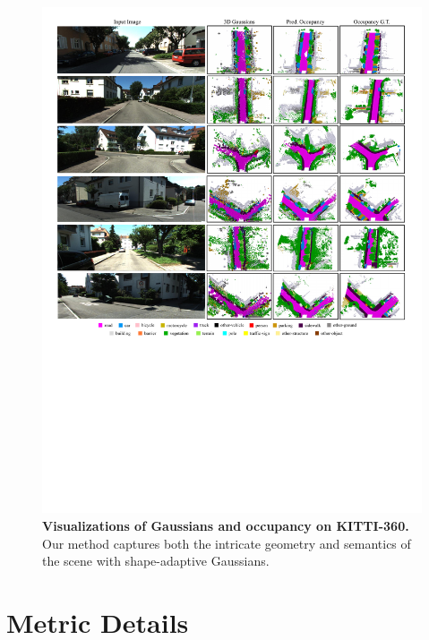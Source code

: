 \begin{figure}[t]
\centering
\includegraphics[width=0.95\linewidth]{figures/supp1.pdf}
\vspace{-2mm}
\caption{\textbf{Visualizations of Gaussians and occupancy on KITTI-360.}
Our method captures both the intricate geometry and semantics of the scene with shape-adaptive Gaussians.
}
\label{fig:supp kitti}
\vspace{-6mm}
\end{figure}





\section{Metric Details}
\label{sec:efficiency metrics}

